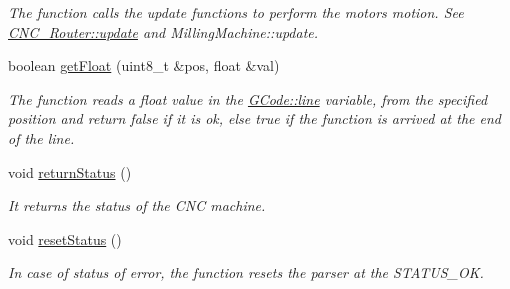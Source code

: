 \begin{DoxyCompactItemize}
\begin{DoxyCompactList}\small\item\em The function calls the update functions to perform the motors motion. See \hyperlink{class_c_n_c___router_ad67d003f8bb12c60f9752126d47408f6}{C\+N\+C\+\_\+\+Router\+::update} and Milling\+Machine\+::update. \end{DoxyCompactList}\item 
boolean \hyperlink{class_g_code_abd9c3a13cf8f2958d8d9f0a563855e7b}{get\+Float} (uint8\+\_\+t \&pos, float \&val)
\begin{DoxyCompactList}\small\item\em The function reads a float value in the \hyperlink{class_g_code_a20d7c90740e9e139b24f68336ad8c8f1}{G\+Code\+::line} variable, from the specified position and return false if it is ok, else true if the function is arrived at the end of the line. \end{DoxyCompactList}\item 
void \hyperlink{class_g_code_a9f7a4d057f394dcc4163f00a2dc6770e}{return\+Status} ()
\begin{DoxyCompactList}\small\item\em It returns the status of the C\+N\+C machine. \end{DoxyCompactList}\item 
void \hyperlink{class_g_code_ab8dbd55ab693f488c083d4fc97a00044}{reset\+Status} ()
\begin{DoxyCompactList}\small\item\em In case of status of error, the function resets the parser at the S\+T\+A\+T\+U\+S\+\_\+\+O\+K. \end{DoxyCompactList}\end{DoxyCompactItemize}
